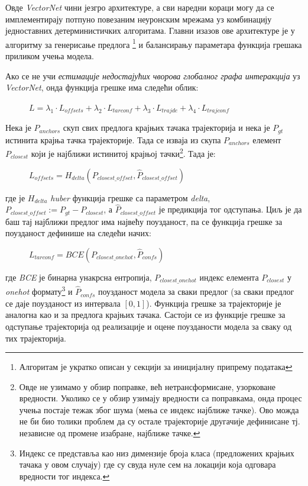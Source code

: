 \documentclass[11pt,oneside]{memoir}
\begin{document}
Овде \textit{VectorNet} чини језгро архитектуре, а сви наредни кораци могу да се имплементирају потпуно повезаним неуронским мрежама уз комбинацију
једноставних детерминистичких алгоритама. Главни изазов ове архитектуре је у алгоритму за генерисање предлога
\footnote{Алгоритам је укратко описан у секцији за иницијалну припрему података} и балансирању
параметара функција грешака приликом учења модела.

\noindent Ако се не учи \textit{естимације недостајућих чворова глобалног графа интеракција} уз \textit{VectorNet}, 
онда функција грешке има следећи облик:

\begin{figure}[H]
  \centering
  $L = \lambda_{1} \cdot L_{offsets} + \lambda_{2} \cdot L_{tarconf} + \lambda_{3} \cdot L_{trajde} + \lambda_{4} \cdot L_{trajconf}$
\end{figure}

Нека је $P_{anchors}$ скуп свих предлога крајњих тачака трајекторија и нека је $P_{gt}$ истинита крајња тачка трајекторије. Тада се изваја
из скупа $P_{anchors}$ елемент $P_{closest}$ који је најближи истинитој крајњој тачки\footnote{Овде не узимамо у обзир поправке, 
већ нетрансформисане, узорковане вредности. 
Уколико се у обзир узимају вредности са поправкама, онда процес учења постаје тежак због шума (мења се индекс најближе тачке). Ово можда не би био
толики проблем да су остале трајекторије другачије дефинисане тј. независне од промене изабране, најближе тачке.}. 
Тада је:

\begin{figure}[H]
  \centering
  $L_{offsets} = H_{delta}(P_{closest\_offset}, \hat{P}_{closest\_offset})$
\end{figure}

\noindent где је $H_{delta}$ \textit{huber} функција грешке са параметром \textit{delta}, $P_{closest\_offset} := P_{gt} - P_{closest}$,
а $\hat{P}_{closest\_offset}$ је предикција тог одступања. Циљ је да баш тај најближи предлог има највећу поузданост, па се функција грешке за 
поузданост дефинише на следећи начих:

\begin{figure}[H]
  \centering
  $L_{tarconf} = BCE(P_{closest\_onehot}, \hat{P}_{confs})$
\end{figure}

\noindent где \textit{BCE} је бинарна унакрсна ентропија, $P_{closest\_onehot}$ индекс елемента $P_{closest}$ у \textit{onehot} 
формату\footnote{Индекс се представља као низ димензије броја класа (предложених крајњих тачака у овом случају) где су свуда нуле сем на локацији која одговара
вредности тог индекса.} и $\hat{P}_{confs}$ поузданост модела за сваки предлог (за сваки предлог се даје поузданост из интервала $[0, 1]$). Функција грешке за
трајекторије је аналогна као и за предлога крајњих тачака. Састоји се из функције грешке за одступање трајекторија од реализације и оцене
поузданости модела за сваку од тих трајекторија.
\end{document}
